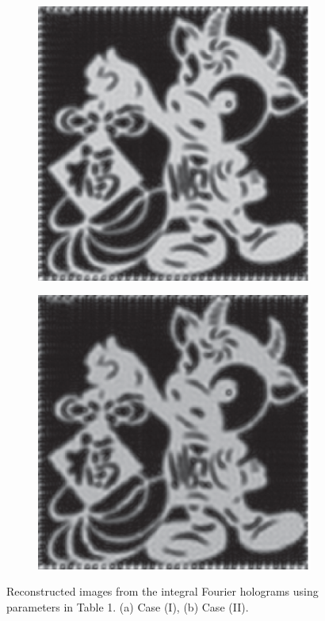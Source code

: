 \documentclass[10pt,letterpaper]{article}
\begin{document}
\begin{figure}[htbp]
 \begin{subfigure}[b]{0.24\linewidth}
  \centering
  \includegraphics[width=1\columnwidth]{14-c}
  \caption{}
  \end{subfigure}
  \begin{subfigure}[b]{0.24\linewidth}
  \includegraphics[width=1\columnwidth]{14-d}
  \centering
  \caption{}
  \end{subfigure}
\caption{Reconstructed images from the integral Fourier holograms using parameters in Table 1. (a) Case (I), (b) Case (II).}
\label{fig_14}
\end{figure}
\end{document}
